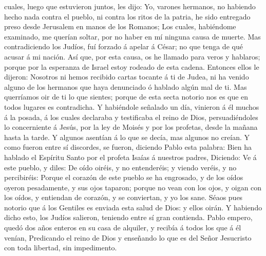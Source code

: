 cuales, luego que estuvieron juntos, les dijo: Yo, varones hermanos, no
habiendo hecho nada contra el pueblo, ni contra los ritos de la patria,
he sido entregado preso desde Jerusalem en manos de los Romanos;
 Los cuales, habiéndome examinado, me querían soltar, por
no haber en mí ninguna causa de muerte.  Mas
contradiciendo los Judíos, fuí forzado á apelar á César; no que tenga de
qué acusar á mi nación.  Así que, por esta causa, os he
llamado para veros y hablaros; porque por la esperanza de Israel estoy
rodeado de esta cadena.  Entonces ellos le dijeron:
Nosotros ni hemos recibido cartas tocante á ti de Judea, ni ha venido
alguno de los hermanos que haya denunciado ó hablado algún mal de ti.
 Mas querríamos oir de ti lo que sientes; porque de esta
secta notorio nos es que en todos lugares es contradicha.
 Y habiéndole señalado un día, vinieron á él muchos á la
posada, á los cuales declaraba y testificaba el reino de Dios,
persuadiéndoles lo concerniente á Jesús, por la ley de Moisés y por los
profetas, desde la mañana hasta la tarde.  Y algunos
asentían á lo que se decía, mas algunos no creían.  Y
como fueron entre sí discordes, se fueron, diciendo Pablo esta palabra:
Bien ha hablado el Espíritu Santo por el profeta Isaías á nuestros
padres,  Diciendo: Ve á este pueblo, y diles: De oído
oiréis, y no entenderéis; y viendo veréis, y no percibiréis:
 Porque el corazón de este pueblo se ha engrosado, y de
los oídos oyeron pesadamente, y sus ojos taparon; porque no vean con los
ojos, y oigan con los oídos, y entiendan de corazón, y se conviertan, y
yo los sane.  Séaos pues notorio que á los Gentiles es
enviada esta salud de Dios: y ellos oirán.  Y habiendo
dicho esto, los Judíos salieron, teniendo entre sí gran contienda.
 Pablo empero, quedó dos años enteros en su casa de
alquiler, y recibía á todos los que á él venían, 
Predicando el reino de Dios y enseñando lo que es del Señor Jesucristo
con toda libertad, sin impedimento.
